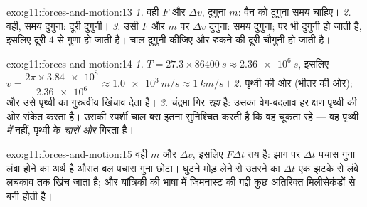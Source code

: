 \begin{solution}{exo:g11:forces-and-motion:13}
\emph{1.} वही $F$ और $\Delta v$, दुगुना $m$: वैन को दुगुना समय चाहिए।
\emph{2.}  वही, समय दुगुना: दूरी दुगुनी। \emph{3.} उसी
$F$ और $m$ पर $\Delta v$ दुगुना: समय दुगुना; पर  भी दुगुनी
हो जाती है, इसलिए दूरी $4$ से गुणा हो जाती है। चाल दुगुनी कीजिए और रुकने
की दूरी चौगुनी हो जाती है।
\end{solution}

\begin{solution}{exo:g11:forces-and-motion:14}
\emph{1.} $T = 27.3 \times \qty{86400}{s} \approx \qty{2.36e6}{s}$, इसलिए $v = \dfrac{2\pi \times \num{3.84e8}}{\num{2.36e6}} \approx
\qty{1.0e3}{m/s} \approx \qty{1}{km/s}$। \emph{2.} पृथ्वी की ओर (भीतर की ओर); और
उसे पृथ्वी का गुरुत्वीय खिंचाव देता है। \emph{3.} चंद्रमा गिर \emph{रहा} है:
उसका वेग-बदलाव हर क्षण पृथ्वी की ओर संकेत करता है। उसकी स्पर्शी चाल बस इतना
सुनिश्चित करती है कि वह चूकता रहे --- वह पृथ्वी \emph{में} नहीं, पृथ्वी के
\emph{चारों ओर} गिरता है।
\end{solution}

\begin{solution}{exo:g11:forces-and-motion:15}
वही $m$ और $\Delta v$, इसलिए $F\Delta t$ तय है: झाग पर $\Delta t$ पचास गुना लंबा होने
का अर्थ है औसत बल पचास गुना छोटा। घुटने मोड़ लेने से उतरने का $\Delta t$
एक झटके से लंबे लचकाव तक खिंच जाता है; और यांत्रिकी की भाषा में जिमनास्ट की
गद्दी कुछ अतिरिक्त मिलीसेकंडों से बनी होती है।
\end{solution}

